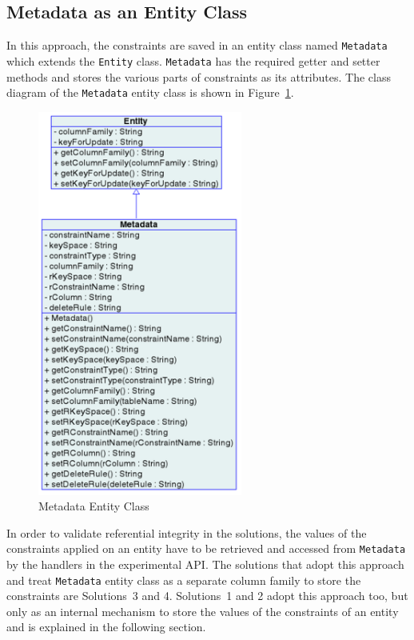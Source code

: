 \subsection{Metadata as an Entity Class} \label{ss:implementation-MDEntityClass}

In this approach,  the constraints are saved in an entity class named
\texttt{Metadata} which extends the \texttt{Entity} class.  \texttt{Metadata} has
the required getter and setter  methods and stores the various parts of constraints as its
attributes.  The class diagram of the
\texttt{Metadata} entity class is shown in Figure~\ref{fi:MetadataEntityClass}. 

	\begin{figure}[h] 
		\centering		
		\includegraphics[width=0.6\textwidth]{./figure/Solutions/FinalMetadata.png}
		\caption{Metadata Entity Class}\label{fi:MetadataEntityClass}
	\end{figure}


In order to validate referential integrity in the solutions,  the values of the
constraints applied on an entity have to be retrieved and accessed from
\texttt{Metadata} by the handlers in the experimental \ac{API}.  The solutions
that adopt this approach and treat \texttt{Metadata} entity class as a separate
column family to store the constraints are Solutions~3 and 4. 
Solutions~1 and 2 adopt this approach too,  but only as an internal mechanism to
store the values of the constraints of an entity and is explained in the
following section. 

